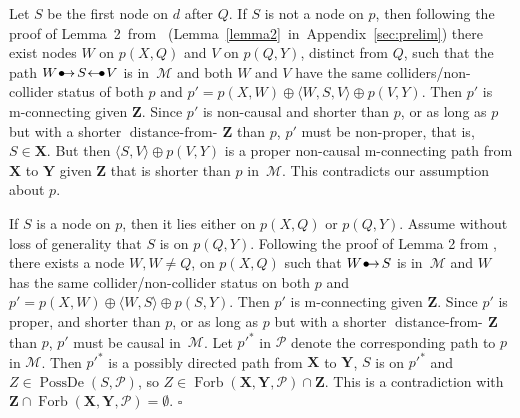 \documentclass[11pt,a4paper]{article}
\newenvironment{proofof}[1][]{\begin{trivlist}
   \item[\hskip \labelsep {\bfseries Proof of #1.}]}{\hfill{}$\square$\end{trivlist}}
\DeclareMathOperator{\PossDe}{PossDe}
\DeclareMathOperator{\distancefrom}{distance-from-\!}
\DeclareMathOperator{\Forbi}{Forb}
\newcommand{\g}[1][G]{\mathcal{#1}}
\newcommand{\fb}[2][X,Y]{\Forbi(\mathbf{#1},#2)}%
\newcommand{\pstar}[1][p]{{#1}^{*}}
\newcommand{\bulletarrow}{
  \setlength{\unitlength}{1mm}
  \begin{picture}(5,1)(0,0)
    \put(0.2,0){$\bullet$}
    \put(1,0){$\rightarrow$}
  \end{picture}
}
\newcommand{\arrowbullet}{
  \setlength{\unitlength}{1mm}
  \begin{picture}(5,1)(0,0)
    \put(0.2,0){$\leftarrow$}
    \put(3,0){$\bullet$}
  \end{picture}
}
\begin{document}
\begin{proofof}[Lemma~\ref{lemma:2}]
 Let $S$ be the first node on $d$ after $Q$.
If $S$ is not a node on $p$, then following the proof of Lemma~2~from~\citet{zhang2006causal} (Lemma~\ref{lemma2}~in~Appendix~\ref{sec:prelim}) there exist nodes $W$ on $p(X,Q)$ and $V$ on $p(Q,Y)$, distinct from $Q$, such that the path $W \bulletarrow S \arrowbullet V$ is in~$\g[M]$ and both $W$ and $V$ have the same colliders/non-collider status of both $p$ and $p' = p(X,W) \oplus \langle W,S,V \rangle \oplus p(V,Y)$. Then $p'$ is m-connecting given $\mathbf{Z}$.
 Since $p'$ is non-causal and shorter than $p$, or as long as $p$ but with a shorter $\distancefrom{\mathbf{Z}}$ than $p$, $p'$ must be non-proper, that is, $S \in \mathbf{X}$.  But then $\langle S,V \rangle \oplus p(V,Y)$ is a proper non-causal m-connecting path from $\mathbf{X}$ to $\mathbf{Y}$ given $\mathbf{Z}$ that is shorter than $p$ in~$\g[M]$. This contradicts our assumption about $p$.

 If $S$ is a node on $p$, then it lies either on $p(X,Q)$ or $p(Q,Y)$. Assume without loss of generality that $S$ is on $p(Q,Y)$. Following the proof of Lemma 2 from \citet{zhang2006causal}, there exists a node $W, W \neq Q$, on $p(X,Q)$ such that $W \bulletarrow S$ is in~$\g[M]$ and $W$ has the same collider/non-collider status on both $p$ and $p' =p(X,W) \oplus  \langle W, S \rangle  \oplus p(S,Y)$. Then $p'$ is m-connecting given $\mathbf{Z}$.
Since $p'$  is proper, and shorter than $p$, or as long as $p$ but with a shorter $\distancefrom{\mathbf{Z}}$ than $p$, $p'$ must be causal in~$\g[M]$. Let $\pstar[p']$ in $\g[P]$ denote the corresponding path to $p$ in $\g[M]$.  Then $\pstar[p']$ is a possibly directed path from $\mathbf{X}$ to $\mathbf{Y}$, $S$ is on $\pstar[p']$ and $Z \in \PossDe(S,\g[P])$, so $Z \in \fb{\g[P]} \cap \mathbf{Z}$. This is a contradiction with $\mathbf{Z} \cap \fb{\g[P]} = \emptyset$.
\end{proofof}
\end{document}
